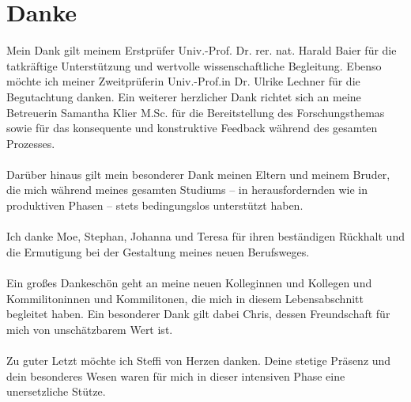 \vspace*{2cm}
\section*{Danke}
\vspace*{1cm}

Mein Dank gilt meinem Erstprüfer Univ.-Prof. Dr. rer. nat. Harald Baier für die tatkräftige Unterstützung und wertvolle wissenschaftliche Begleitung. Ebenso möchte ich meiner Zweitprüferin Univ.-Prof.in Dr. Ulrike Lechner für die Begutachtung danken. Ein weiterer herzlicher Dank richtet sich an meine Betreuerin Samantha Klier M.Sc. für die Bereitstellung des Forschungsthemas sowie für das konsequente und konstruktive Feedback während des gesamten Prozesses.\\
\\

Darüber hinaus gilt mein besonderer Dank meinen Eltern und meinem Bruder, die mich während meines gesamten Studiums – in herausfordernden wie in produktiven Phasen – stets bedingungslos unterstützt haben.\\
\\

Ich danke Moe, Stephan, Johanna und Teresa für ihren beständigen Rückhalt und die Ermutigung bei der Gestaltung meines neuen Berufsweges.\\
\\

Ein großes Dankeschön geht an meine neuen Kolleginnen und Kollegen und Kommilitoninnen und Kommilitonen, die mich in diesem Lebensabschnitt begleitet haben. Ein besonderer Dank gilt dabei Chris, dessen Freundschaft für mich von unschätzbarem Wert ist.\\
\\

Zu guter Letzt möchte ich Steffi von Herzen danken. Deine stetige Präsenz und dein besonderes Wesen waren für mich in dieser intensiven Phase eine unersetzliche Stütze.